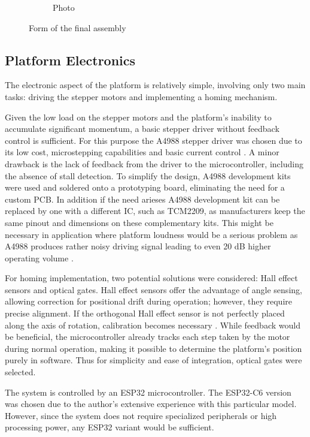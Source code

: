 \begin{figure}[h!]
\begin{subfigure}[b]{0.45\textwidth}
    \caption{Photo}
  \end{subfigure}
  \caption{Form of the final assembly}
  \label{fig:side_by_side}
\end{figure}


\subsection{Platform Electronics}

The electronic aspect of the platform is relatively simple, involving only two main tasks: driving the stepper motors and implementing a homing mechanism.

Given the low load on the stepper motors and the platform's inability to accumulate significant momentum, a basic stepper driver without feedback control is sufficient.
For this purpose the A4988 stepper driver was chosen due to its low cost, microstepping capabilities and basic current control \cite{a4988}.
A minor drawback is the lack of feedback from the driver to the microcontroller, including the absence of stall detection.
To simplify the design, A4988 development kits were used and soldered onto a prototyping board, eliminating the need for a custom PCB.
In addition if the need arieses A4988 development kit can be replaced by one with a different IC, such as TCM2209, as manufacturers keep the same pinout and dimensions on these complementary kits.
This might be necessary in application where platform loudness would be a serious problem as A4988 produces rather noisy driving signal leading to even 20 dB higher operating volume \cite{a4988_sound}.


For homing implementation, two potential solutions were considered: Hall effect sensors and optical gates.
Hall effect sensors offer the advantage of angle sensing, allowing correction for positional drift during operation; however, they require precise alignment.
If the orthogonal Hall effect sensor is not perfectly placed along the axis of rotation, calibration becomes necessary \cite{hall}.
While feedback would be beneficial, the microcontroller already tracks each step taken by the motor during normal operation, making it possible to determine the platform's position purely in software.
Thus for simplicity and ease of integration, optical gates were selected.

The system is controlled by an ESP32 microcontroller.
The ESP32-C6 version was chosen due to the author's extensive experience with this particular model.
However, since the system does not require specialized peripherals or high processing power, any ESP32 variant would be sufficient.

